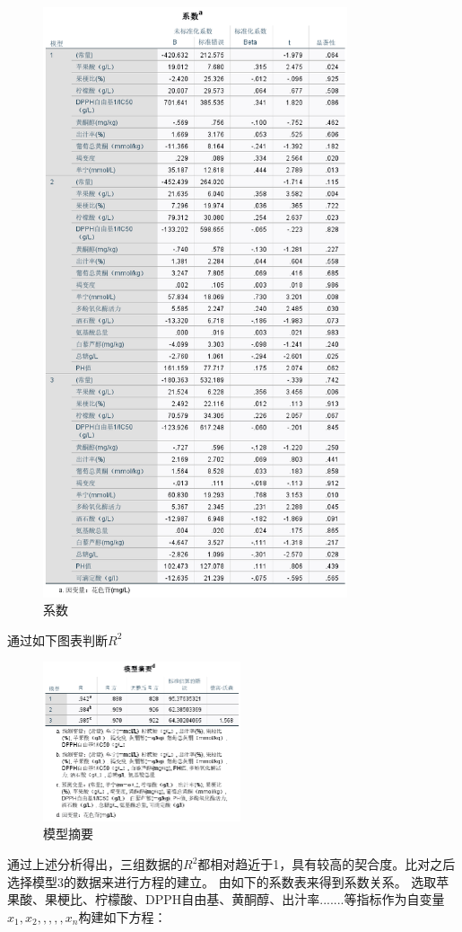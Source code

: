 \documentclass[UTF8]{ctexart}
\begin{document}
\begin{figure}[H]\centering
	\includegraphics[width=0.8\textwidth,height=1.07\textwidth]{img/Coefficient_table.png} %
	\caption{系数} %
	\label{fig:figure 8} %
\end{figure}

通过如下图表判断${R^2}$
\begin{figure}[H]\centering
	\includegraphics[width=0.52\textwidth,height=0.45\textwidth]{img/abstrat.png} %
	\caption{模型摘要} %
	\label{fig:figure 7} %
\end{figure}
通过上述分析得出，三组数据的${R^2}$都相对趋近于1，具有较高的契合度。比对之后选择模型3的数据来进行方程的建立。
由如下的系数表来得到系数关系。
选取苹果酸、果梗比、柠檬酸、DPPH自由基、黄酮醇、出汁率.......等指标作为自变量${x_1,x_2,,,,,x_n}$构建如下方程：
\end{document}
